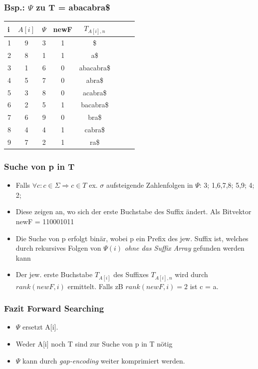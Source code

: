 \documentclass{beamer}
\begin{document}
\begin{frame}
\frametitle{Bsp.: $\Psi$ zu T = \glqq abacabra\$\grqq}
\begin{tabular}{l<{\ttfamily}|c<{\ttfamily} c<{\ttfamily}c<{\ttfamily} c<{\ttfamily}c<{\ttfamily}c<{\ttfamily} r<{\ttfamily}}
i & $A[i]$ & $\Psi$ & newF & $T_{A[i],n}$ \\\hline
1 & 9 & 3 & 1 &\$\\
2 & 8 & 1 & 1 &a\$\\
3 & 1 & 6 & 0 &abacabra\$\\
4 & 5 & 7 & 0 &abra\$\\
5 & 3 & 8 & 0 &acabra\$\\
6 & 2 & 5 & 1 &bacabra\$\\
7 & 6 & 9 & 0 &bra\$\\
8 & 4 & 4 & 1 &cabra\$\\
9 & 7 & 2 & 1 &ra\$\\
\end{tabular}
\end{frame}
\begin{frame}
\frametitle{Suche von p in T}
\begin{itemize}
\item Falls $\forall c: c \in \Sigma \Rightarrow c \in T$ ex. $\sigma$ aufsteigende Zahlenfolgen in $\Psi$: 3; 1,6,7,8; 5,9; 4; 2;
\item Diese zeigen an, wo sich der erste Buchstabe des Suffix ändert. Als Bitvektor newF = 110001011
\item Die Suche von p erfolgt binär, wobei p ein Prefix des jew. Suffix ist, welches durch rekursives Folgen von $\Psi(i)$ \textit{ohne das Suffix Array} gefunden werden kann
\item Der jew. erste Buchstabe $T_{A[i]}$ des Suffixes $T_{A[i],n}$ wird durch $rank(newF,i)$ ermittelt. Falls zB $rank(newF,i) = 2$ ist c = \glqq a\grqq.
\end{itemize}
\end{frame}
\begin{frame}
\frametitle{Fazit Forward Searching}
\begin{itemize}
\item $\Psi$ ersetzt A[i].
\item Weder A[i] noch T sind zur Suche von p in T nötig
\item $\Psi$ kann durch \textit{gap-encoding} weiter komprimiert werden.
\end{itemize}
\end{frame}
\end{document}
